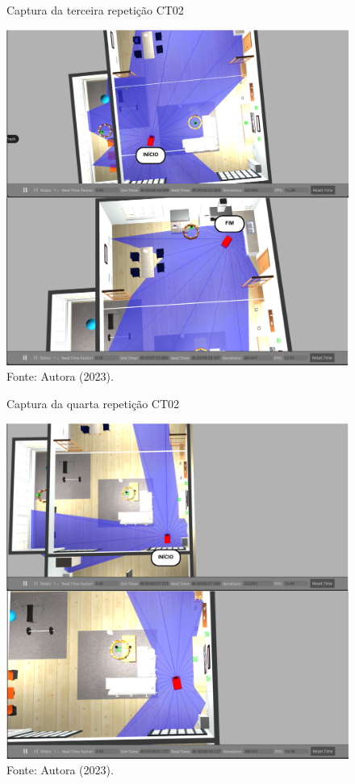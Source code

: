 \begin{figure}[H]
    \centering
    \caption{Captura da terceira repetição CT02}
    \includegraphics[scale=0.5]{ct02_3.png}
    \caption*{Fonte: Autora (2023).}
    \label{fig:ct02_3}
\end{figure}

\begin{figure}[H]
    \centering
    \caption{Captura da quarta repetição CT02}
    \includegraphics[scale=0.5]{ct02_4.png}
    \caption*{Fonte: Autora (2023).}
    \label{fig:ct02_4}
\end{figure}

